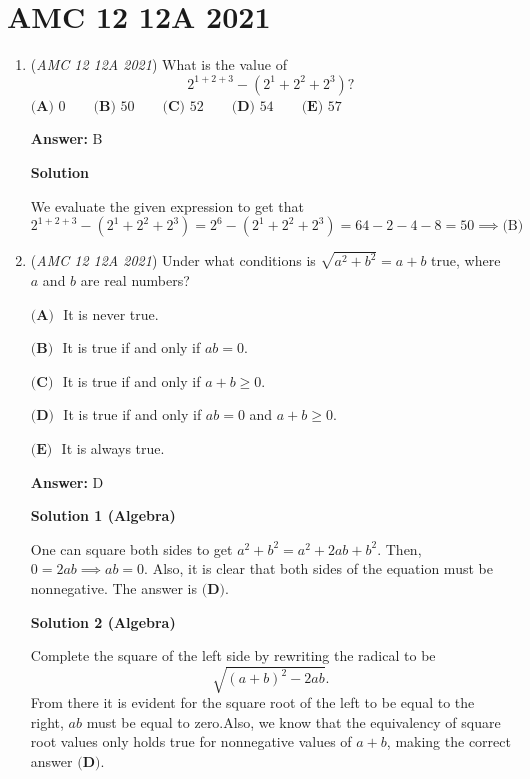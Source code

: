 \section{AMC 12 12A 2021}
        \begin{enumerate}
        	\item (\textit{AMC 12 12A 2021}) What is the value of
 \[2^{1+2+3}-(2^1+2^2+2^3)?\]
$\textbf{(A) }0 \qquad \textbf{(B) }50 \qquad \textbf{(C) }52 \qquad \textbf{(D) }54 \qquad \textbf{(E) }57$

 \textbf{Answer: }B



\textbf{Solution}

We evaluate the given expression to get that 
 \[2^{1+2+3}-(2^1+2^2+2^3)=2^6-(2^1+2^2+2^3)=64-2-4-8=50 \implies \boxed{\text{(B)}}\]



	\item (\textit{AMC 12 12A 2021}) Under what conditions is $\sqrt{a^2+b^2}=a+b$ true, where $a$ and $b$ are real numbers?


 $\textbf{(A) }$ It is never true.


 $\textbf{(B) }$ It is true if and only if $ab=0$.


 $\textbf{(C) }$ It is true if and only if $a+b\ge 0$.


 $\textbf{(D) }$ It is true if and only if $ab=0$ and $a+b\ge 0$.


 $\textbf{(E) }$ It is always true.


 
 \textbf{Answer: }D



\textbf{Solution 1 (Algebra)}

One can square both sides to get $a^{2}+b^{2}=a^{2}+2ab+b^{2}$. Then, $0=2ab\implies ab=0$. Also, it is clear that both sides of the equation must be nonnegative. The answer is $\boxed{\textbf{(D)}}$.

 



\textbf{Solution 2 (Algebra)}

Complete the square of the left side by rewriting the radical to be 
 \[\sqrt{(a+b)^{2}-2ab}.\]From there it is evident for the square root of the left to be equal to the right, $ab$ must be equal to zero.Also, we know that the equivalency of square root values only holds true for nonnegative values of $a+b$, making the correct answer $\boxed{\textbf{(D)}}.$





\end{enumerate}
